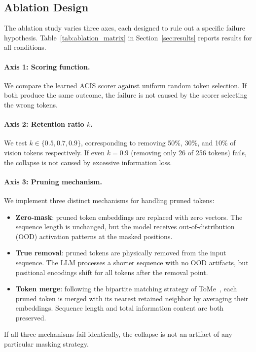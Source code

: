 \subsection{Ablation Design}
\label{sec:ablation_design}

The ablation study varies three axes, each designed to rule out a specific failure hypothesis. Table~\ref{tab:ablation_matrix} in Section~\ref{sec:results} reports results for all conditions.

\paragraph{Axis 1: Scoring function.}
We compare the learned ACIS scorer against uniform random token selection. If both produce the same outcome, the failure is not caused by the scorer selecting the wrong tokens.

\paragraph{Axis 2: Retention ratio $k$.}
We test $k \in \{0.5, 0.7, 0.9\}$, corresponding to removing 50\%, 30\%, and 10\% of vision tokens respectively. If even $k{=}0.9$ (removing only 26 of 256 tokens) fails, the collapse is not caused by excessive information loss.

\paragraph{Axis 3: Pruning mechanism.}
We implement three distinct mechanisms for handling pruned tokens:
\begin{itemize}[nosep,leftmargin=*]
  \item \textbf{Zero-mask}: pruned token embeddings are replaced with zero vectors. The sequence length is unchanged, but the model receives out-of-distribution (OOD) activation patterns at the masked positions.
  \item \textbf{True removal}: pruned tokens are physically removed from the input sequence. The LLM processes a shorter sequence with no OOD artifacts, but positional encodings shift for all tokens after the removal point.
  \item \textbf{Token merge}: following the bipartite matching strategy of ToMe~\cite{bolya2023tome}, each pruned token is merged with its nearest retained neighbor by averaging their embeddings. Sequence length and total information content are both preserved.
\end{itemize}
If all three mechanisms fail identically, the collapse is not an artifact of any particular masking strategy.

